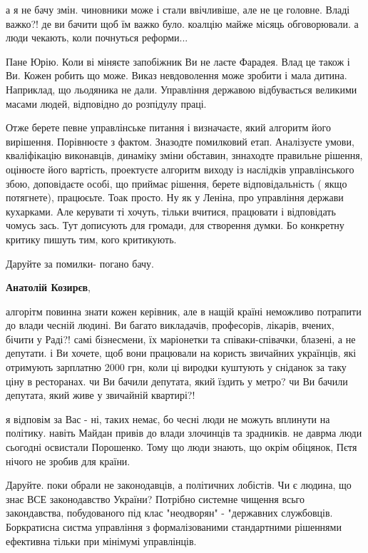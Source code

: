 \begin{itemize}
а я не бачу змін. чиновники може і стали ввічливіше, але не це головне. Владі
важко?! де ви бачити щоб їм важко було. коалцію майже місяць обговорювали. а
люди чекають, коли почнуться реформи...


Пане Юрію. Коли ві міняєте запобіжник Ви не лаєте Фарадея. Влад це також і Ви.
Кожен робить що може. Виказ невдоволення може зробити і мала дитина. Наприклад,
що льодяника не дали. Управління державою відбувається великими масами людей,
відповідно до розпідулу праці. 

Отже берете певне управлінське питання і
визначаєте, який алгоритм його вирішення. Порівнюєте з фактом. Зназодте
помилковий етап. Аналізуєте умови, кваліфікацію виконавців, динаміку зміни
обставин, зннаходте правильне рішення, оцінюєте його вартість, проектуєте
алгоритм виходу із наслідків управлінського збою, доповідаєте особі, що приймає
рішення, берете відповідальність ( якщо потягнете), працюєьте. Тоак просто. Ну
як у Леніна, про управління держави кухарками. Але керувати ті хочуть, тільки
вчитися, працювати і відповідать чомусь зась. Тут дописують для громади, для
створення думки. Бо конкретну критику пишуть тим, кого критикують.


Даруйте за помилки- погано бачу.

\textbf{Анатолій Козирєв}, 

алгорітм повинна знати кожен керівник, але в нащій країні неможливо потрапити
до влади чесній людині. Ви багато викладачів, професорів, лікарів, вчених,
бічити у Раді?! самі бізнесмени, їх маріонетки та співаки-співачки, блазені, а
не депутати. і Ви хочете, щоб вони працювали на користь звичайних українців,
які отримують зарплатню 2000 грн, коли ці виродки куштують у сніданок за таку
ціну в ресторанах. чи Ви бачили депутата, який їздить у метро? чи Ви бачили
депутата, який живе у звичайній квартирі?!


я відповім за Вас - ні, таких немає, бо чесні люди не можуть вплинути на
політику. навіть Майдан привів до влади злочинців та зрадників. не даврма люди
сьогодні освистали Порошенко. Тому що люди знають, що окрім обіцянок, Пєтя
нічого не зробив для країни.


Даруйте. поки обрали не законодавців, а політичних лобістів. Чи є людина, що
знає ВСЕ законодавство України? Потрібно системне чищення всьго закондавства,
побудованого під клас "неодворян" - "державних службовців. Боркратисна систма
управління з формалізованими стандартними рішеннями ефективна тільки при
мінімумі управлінців. 


\end{itemize}

